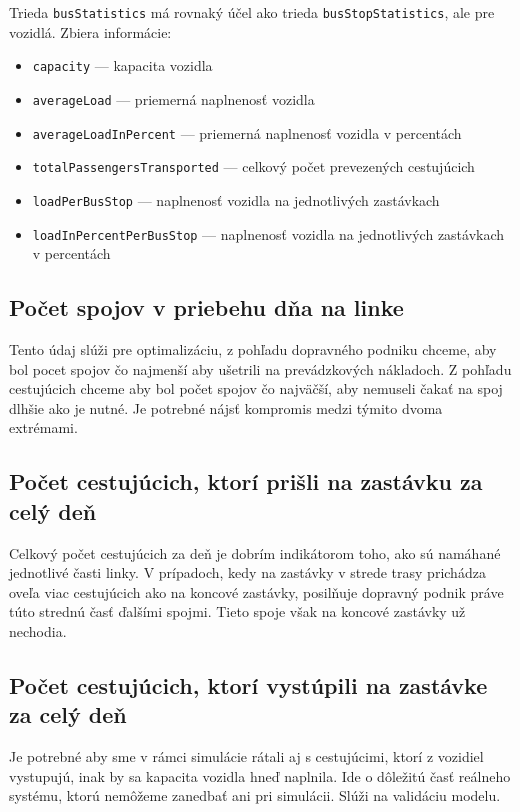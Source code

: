 Trieda \texttt{busStatistics} má rovnaký účel ako trieda \texttt{busStopStatistics}, ale pre vozidlá.
Zbiera informácie:
\begin{itemize}
  \item \texttt{capacity} --- kapacita vozidla
  \item \texttt{averageLoad} --- priemerná naplnenosť vozidla
  \item \texttt{averageLoadInPercent} --- priemerná naplnenosť vozidla v percentách
  \item \texttt{totalPassengersTransported} --- celkový počet prevezených cestujúcich
  \item \texttt{loadPerBusStop} --- naplnenosť vozidla na jednotlivých zastávkach
  \item \texttt{loadInPercentPerBusStop} --- naplnenosť vozidla na jednotlivých zastávkach v percentách
\end{itemize}

\subsection*{Počet spojov v priebehu dňa na linke}
Tento údaj slúži pre optimalizáciu, z pohľadu dopravného podniku chceme, aby bol pocet spojov čo najmenší aby ušetrili na prevádzkových nákladoch.
Z pohľadu cestujúcich chceme aby bol počet spojov čo najväčší, aby nemuseli čakať na spoj dlhšie ako je nutné.
Je potrebné nájsť kompromis medzi týmito dvoma extrémami.

\subsection*{Počet cestujúcich, ktorí prišli na zastávku za celý deň}
Celkový počet cestujúcich za deň je dobrím indikátorom toho, ako sú namáhané jednotlivé časti linky.
V prípadoch, kedy na zastávky v strede trasy prichádza oveľa viac cestujúcich ako na koncové zastávky, posilňuje dopravný podnik práve túto strednú časť ďalšími spojmi.
Tieto spoje však na koncové zastávky už nechodia.

\subsection*{Počet cestujúcich, ktorí vystúpili na zastávke za celý deň}
Je potrebné aby sme v rámci simulácie rátali aj s cestujúcimi, ktorí z vozidiel vystupujú, inak by sa kapacita vozidla hneď naplnila.
Ide o dôležitú časť reálneho systému, ktorú nemôžeme zanedbať ani pri simulácii.
Slúži na validáciu modelu.

